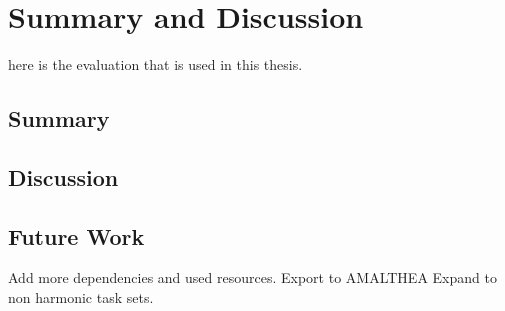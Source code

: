 \chapter{Summary and Discussion}
here is the evaluation that is used in this thesis.

\section{Summary}

\section{Discussion}

\section{Future Work}
Add more dependencies and used resources.
Export to AMALTHEA
Expand to non harmonic task sets.